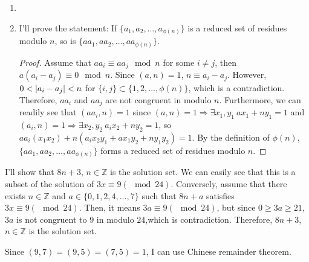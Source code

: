 \documentclass[12pt]{article}
\newenvironment{problem}[2][Problem]{\begin{trivlist}
\item[\hskip \labelsep {\bfseries #1}\hskip \labelsep {\bfseries #2.}]}{\end{trivlist}}
\begin{document}




\begin{problem}{1}
\end{problem}
\begin{enumerate}

    \item[(a)] 

    \item[(b)] I'll prove the statement: If $\{a_1, a_2, \ldots, a_{\phi(n)}\}$ is a reduced set of residues modulo $n$, so is $\{aa_1, aa_2, \ldots, aa_{\phi(n)}\}$.
    \begin{proof}
    Assume that $aa_i\equiv aa_j \mod n$ for some $i\neq j$, then $a(a_i-a_j)\equiv 0 \mod n$. Since $(a,n)=1$, $n\equiv a_i-a_j$. However, $0<\abs{a_i-a_j}<n$ for $\{i,j\}\subset \{1, 2, \ldots, \phi(n)\}$, which is a contradiction. Therefore, $aa_i$ and $aa_j$ are not congruent in modulo $n$. Furthermore, we can readily see that $(aa_i, n)=1$ since $(a,n)=1\Rightarrow \exists x_1,y_1~ax_1+ny_1=1$ and $(a_i, n)=1\Rightarrow \exists x_2, y_2~a_ix_2+ny_2=1$, so $aa_i(x_1x_2)+n(a_ix_2y_1+ax_1y_2+ny_1y_2)=1$. By the definition of $\phi(n)$, $\{aa_1, aa_2, \ldots, aa_{\phi(n)}\}$ forms a reduced set of residues modulo $n$.
    \end{proof} 
    
\end{enumerate}



\newpage
\begin{problem}{2}
\end{problem}
I'll show that $8n+3$, $n\in \mathbb{Z}$ is the solution set. We can easily see that this is a subset of the solution of $3x\equiv 9 (\mod 24)$. Conversely, assume that there exists $n\in \mathbb{Z}$ and $a\in\{0, 1, 2, 4, \ldots, 7\}$ such that $8n+a$ satisfies $3x\equiv 9 (\mod 24)$. Then, it means $3a\equiv 9 (\mod 24)$, but since $0\geq 3a\geq 21$, $3a$ is not congruent to $9$ in modulo $24$,which is contradiction. Therefore, $8n+3$, $n\in \mathbb{Z}$ is the solution set.
\begin{problem}{3}
\end{problem}
Since $(9,7)=(9,5)=(7,5)=1$, I can use Chinese remainder theorem.
\end{document}
